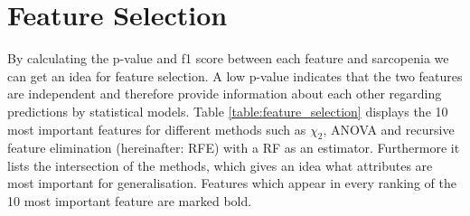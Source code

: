 \documentclass[11pt]{article}
\begin{document}
\section{Feature Selection}
By calculating the p-value and f1 score between each feature and sarcopenia we can get an idea for feature selection. A low p-value indicates that the two features are independent and therefore provide information about each other regarding predictions by statistical models. Table \ref{table:feature_selection} displays the 10 most important features for different methods such as $\chi_2$, ANOVA and recursive feature elimination (hereinafter: RFE) with a RF as an estimator. Furthermore it lists the intersection of the methods, which gives an idea what attributes are most important for generalisation. Features which appear in every ranking of the 10 most important feature are marked bold.



\printbibliography[heading=bibintoc, title={References}]
\end{document}

